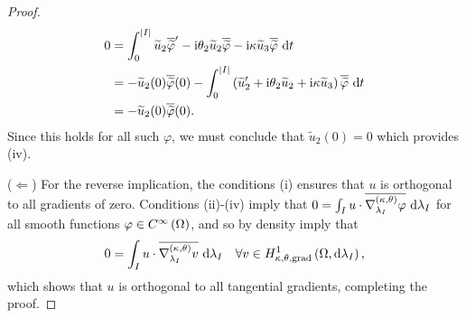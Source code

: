 \begin{proof}
\begin{align*}
		0 
		&= \int_0^{\left\lvert I \right\rvert} \widetilde{u}_2\overline{\widetilde{\varphi}}' - \mathrm{i}\theta_2\widetilde{u}_2\overline{\widetilde{\varphi}} - \mathrm{i}\kappa\widetilde{u}_3\overline{\widetilde{\varphi}} \ \mathrm{d} t \\
		&= -\widetilde{u}_2(0)\overline{\widetilde{\varphi}}(0)
		- \int_0^{\left\lvert I \right\rvert} \left(  \widetilde{u}'_2 + \mathrm{i}\theta_2\widetilde{u}_2 + \mathrm{i}\kappa\widetilde{u}_3  \right)\overline{\widetilde{\varphi}} \ \mathrm{d} t \\
		&= -\widetilde{u}_2(0)\overline{\widetilde{\varphi}}(0).
	\end{align*}
	Since this holds for all such $\varphi$, we must conclude that $\widetilde{u}_2(0)=0$ which provides (iv).
	
	($\Leftarrow$) For the reverse implication, the conditions (i) ensures that $u$ is orthogonal to all gradients of zero.
	Conditions (ii)-(iv) imply that $0 = \int_{I} u\cdot\overline{\nabla^{\left( \kappa, \theta \right)}_{\lambda_I}\varphi}  \ \mathrm{d}\lambda_I$ for all smooth functions $\varphi\in C^{\infty}\left( \Omega \right)$, and so by density imply that
	\begin{align*}
		0 = \int_{I} u\cdot\overline{\nabla^{\left( \kappa, \theta \right)}_{\lambda_I}v}  \ \mathrm{d}\lambda_I \quad\forall v\in H^1_{\kappa,\theta,\mathrm{grad}}\left( \Omega, \mathrm{d}\lambda_I \right),
	\end{align*}
	which shows that $u$ is orthogonal to all tangential gradients, completing the proof.
\end{proof}

